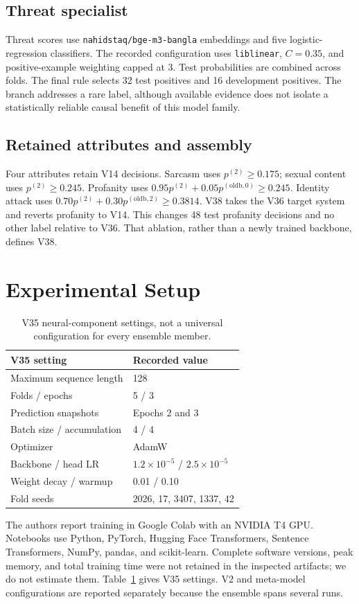 \documentclass[10pt,a4paper]{article}
\newcommand{\checkpoint}[1]{{\small\nolinkurl{#1}}}
\begin{document}
\subsection{Threat specialist}
Threat scores use \checkpoint{nahidstaq/bge-m3-bangla} embeddings and five logistic-regression classifiers. The recorded configuration uses \texttt{liblinear}, $C=0.35$, and positive-example weighting capped at 3. Test probabilities are combined across folds. The final rule selects 32 test positives and 16 development positives. The branch addresses a rare label, although available evidence does not isolate a statistically reliable causal benefit of this model family.

\subsection{Retained attributes and assembly}
Four attributes retain V14 decisions. Sarcasm uses $p^{(2)}\geq0.175$; sexual content uses $p^{(2)}\geq0.245$. Profanity uses $0.95p^{(2)}+0.05p^{(\mathrm{oldb},0)}\geq0.245$. Identity attack uses $0.70p^{(2)}+0.30p^{(\mathrm{oldb},2)}\geq0.3814$. V38 takes the V36 target system and reverts profanity to V14. This changes 48 test profanity decisions and no other label relative to V36. That ablation, rather than a newly trained backbone, defines V38.

\section{Experimental Setup}
\begin{table}[t]\centering\small
\begin{tabular}{ll}\toprule
V35 setting & Recorded value\\\midrule
Maximum sequence length & 128\\
Folds / epochs & 5 / 3\\
Prediction snapshots & Epochs 2 and 3\\
Batch size / accumulation & 4 / 4\\
Optimizer & AdamW\\
Backbone / head LR & $1.2\times10^{-5}$ / $2.5\times10^{-5}$\\
Weight decay / warmup & 0.01 / 0.10\\
Fold seeds & 2026, 17, 3407, 1337, 42\\\bottomrule
\end{tabular}
\caption{V35 neural-component settings, not a universal configuration for every ensemble member.}\label{tab:setup}
\end{table}
The authors report training in Google Colab with an NVIDIA T4 GPU. Notebooks use Python, PyTorch, Hugging Face Transformers, Sentence Transformers, NumPy, pandas, and scikit-learn. Complete software versions, peak memory, and total training time were not retained in the inspected artifacts; we do not estimate them. Table~\ref{tab:setup} gives V35 settings. V2 and meta-model configurations are reported separately because the ensemble spans several runs.
\end{document}
